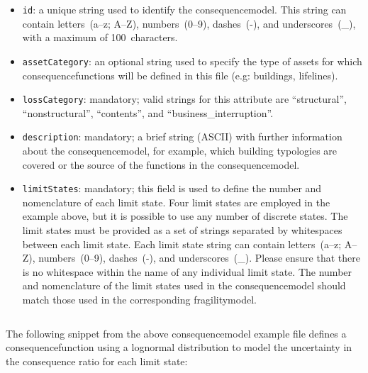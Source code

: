 \begin{itemize}

  \item \Verb+id+: a unique string used to identify the \gls{consequencemodel}.
    This string can contain letters~(a--z; A--Z), numbers~(0--9), dashes~(-), 
    and underscores~(\_), with a maximum of 100~characters.

  \item \Verb+assetCategory+: an optional string used to specify the type of
    \glspl{asset} for which \glspl{consequencefunction} will be defined in
    this file (e.g: buildings, lifelines).

  \item \Verb+lossCategory+: mandatory; valid strings for this attribute are 
    ``structural'', ``nonstructural'', ``contents'', and 
    ``business\_interruption''.

  \item \Verb+description+: mandatory; a brief string (ASCII) with further 
    information about the \gls{consequencemodel}, for example, which building
    typologies are covered or the source of the functions in the
    \gls{consequencemodel}.

  \item \Verb+limitStates+: mandatory; this field is used to define the number and 
    nomenclature of each limit state. Four limit states are employed in the 
    example above, but it is possible to use any number of discrete states. The 
    limit states must be provided as a set of strings separated by whitespaces 
    between each limit state. Each limit state string can contain
    letters~(a--z; A--Z), numbers~(0--9), dashes~(-), and underscores~(\_). 
    Please ensure that there is no whitespace within the name of any individual
    limit state. The number and nomenclature of the limit states used in the
    \gls{consequencemodel} should match those used in the corresponding
    \gls{fragilitymodel}.

\end{itemize}

\inputminted[firstline=4,firstnumber=4,lastline=9,fontsize=\footnotesize,frame=single,linenos,bgcolor=lightgray]{xml}{oqum/risk/Verbatim/input_consequence.xml}

The following snippet from the above \gls{consequencemodel} example file
defines a \gls{consequencefunction} using a lognormal distribution to model
the uncertainty in the consequence ratio for each limit state:

